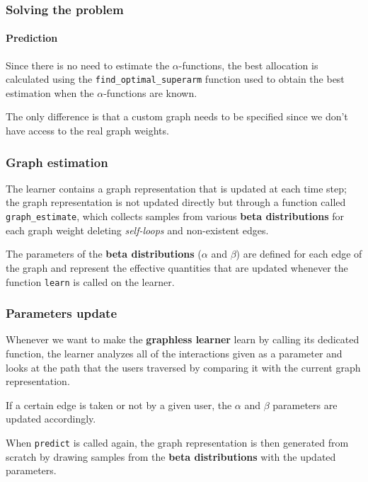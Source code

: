 
\begin{frame}

\frametitle{Solving the problem}
\framesubtitle{Prediction}

Since there is no need to estimate the $\alpha$-functions, the best allocation is calculated using the \texttt{find\_optimal\_superarm} function used to obtain the best estimation when the $\alpha$-functions are known.

The only difference is that a custom graph needs to be specified since we don't have access to the real graph weights.

\end{frame}


\begin{frame}

\frametitle{Graph estimation}

The learner contains a graph representation that is updated at each time step; the graph representation is not updated directly but through a function called \texttt{graph\_estimate}, which collects samples from various \textbf{beta distributions} for each graph weight deleting \textit{self-loops} and non-existent edges.

The parameters of the \textbf{beta distributions} ($\alpha$ and $\beta$) are defined for each edge of the graph and represent the effective quantities that are updated whenever the function \texttt{learn} is called on the learner.

\end{frame}


\begin{frame}

\frametitle{Parameters update}

Whenever we want to make the \textbf{graphless learner} learn by calling its dedicated function, the learner analyzes all of the interactions given as a parameter and looks at the path that the users traversed by comparing it with the current graph representation.

If a certain edge is taken or not by a given user, the $\alpha$ and $\beta$ parameters are updated accordingly.

When \texttt{predict} is called again, the graph representation is then generated from scratch by drawing samples from the \textbf{beta distributions} with the updated parameters.

\end{frame}

